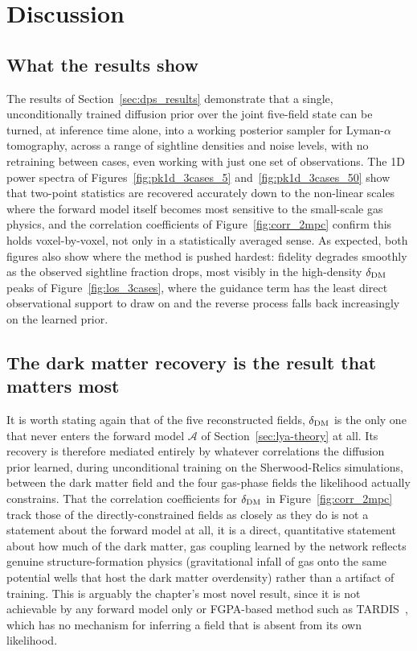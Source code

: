 \section{Discussion}
\label{sec:dps_discussion}

\subsection{What the results show}
\label{sec:dps_disc_summary}

The results of Section~\ref{sec:dps_results} demonstrate that a single, unconditionally trained diffusion prior over the joint five-field state can be turned, at inference time alone, into a working posterior sampler for Lyman-$\alpha$ tomography, across a range of sightline densities and noise levels, with no retraining between cases, even working with just one set of observations. The 1D power spectra of Figures~\ref{fig:pk1d_3cases_5} and~\ref{fig:pk1d_3cases_50} show that two-point statistics are recovered accurately down to the non-linear scales where the forward model itself becomes most sensitive to the small-scale gas physics, and the correlation coefficients of Figure~\ref{fig:corr_2mpc} confirm this holds voxel-by-voxel, not only in a statistically averaged sense. As expected, both figures also show where the method is pushed hardest: fidelity degrades smoothly as the observed sightline fraction drops, most visibly in the high-density $\delta_{\rm DM}$ peaks of Figure~\ref{fig:los_3cases}, where the guidance term has the least direct observational support to draw on and the reverse process falls back increasingly on the learned prior.

\subsection{The dark matter recovery is the result that matters most}
\label{sec:dps_disc_dm}

It is worth stating again that of the five reconstructed fields, $\delta_{\rm DM}$ is the only one that never enters the forward model $\mathcal{A}$ of Section~\ref{sec:lya-theory} at all. Its recovery is therefore mediated entirely by whatever correlations the diffusion prior learned, during unconditional training on the Sherwood-Relics simulations, between the dark matter field and the four gas-phase fields the likelihood actually constrains. That the correlation coefficients for $\delta_{\rm DM}$ in Figure~\ref{fig:corr_2mpc} track those of the directly-constrained fields as closely as they do is not a statement about the forward model at all, it is a direct, quantitative statement about how much of the dark matter, gas coupling learned by the network reflects genuine structure-formation physics (gravitational infall of gas onto the same potential wells that host the dark matter overdensity) rather than a artifact of training. This is arguably the chapter's most novel result, since it is not achievable by any forward model only or FGPA-based method such as TARDIS~\citep{horowitz_2019,horowitz_2021}, which has no mechanism for inferring a field that is absent from its own likelihood. 

